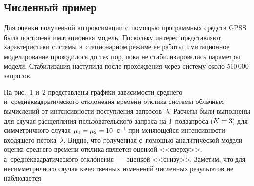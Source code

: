 \begin{multicols}{2}
\vspace*{-6pt}

\section{Численный пример}

\vspace*{-3pt}

  Для оценки полученной аппроксимации с~помощью программных средств 
GPSS была построена имитационная модель. Поскольку интерес представляют 
характеристики системы в~стационарном режиме ее работы, имитационное 
моделирование проводилось до тех пор, пока не стабилизировались параметры 
модели. Стабилизация наступила после прохождения через систему около 
500\,000 запросов.
  

  
  На рис.~1 и~2 представлены графики зависи\-мости среднего 
  и~среднеквадратического отклонения времени отклика системы облачных 
вычислений от интенсивности поступления запросов~$\lambda$. Расчеты были 
выполнены для случая расщепления пользовательского запроса на 
3~подзапроса ($K\hm=3$) для симметричного случая $\mu_1\hm= \mu_2\hm= 
10$~с$^{-1}$ при меняющейся интенсивности входящего потока~$\lambda$. 
Видно, что полученная с~помощью аналитической модели оценка среднего 
времени отклика является оценкой <<сверху>>, а~среднеквадратического 
отклонения~--- оценкой <<снизу>>. Заметим, что для несимметричного случая 
качественных изменений численных результатов не наблюдается.

\begin{figure*}
\vspace*{1pt}
\begin{minipage}[t]{79mm}
\begin{center}  %
\mbox{%
 \epsfxsize=77.81mm
 }
\end{center}
 \vspace*{-9pt}
\end{minipage}
\hfill
            \vspace*{1pt}
            \begin{minipage}[t]{79mm}
 \begin{center}
 \mbox{%
 \epsfxsize=77.707mm
 }
 \end{center}
 \vspace*{-9pt}
\end{minipage}
\end{figure*}


\end{multicols}
